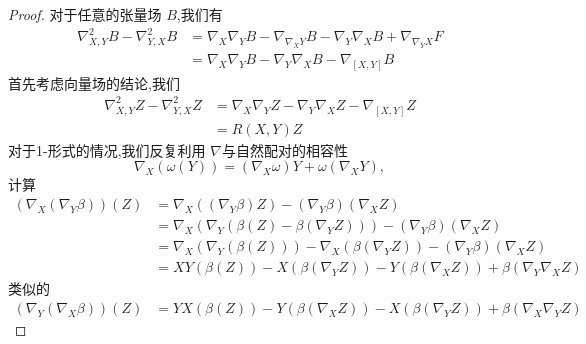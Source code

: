 \documentclass[../../几何与拓扑.tex]{subfiles}
\begin{document}
\begin{proof}

    对于任意的张量场 \(  B  \),我们有 \[
    \begin{aligned}
        \nabla ^{2}_{X,Y}B- \nabla ^{2}_{Y,X}B&=  \nabla _{X} \nabla _{Y}B- \nabla _{ \nabla _{X}Y}B- \nabla _{Y} \nabla _{X}B+  \nabla _{ \nabla _{Y}X}F \\ 
         & =  \nabla _{X} \nabla _{Y}B- \nabla _{Y} \nabla _{X}B- \nabla _{\left[ X,Y \right] }B
    \end{aligned}
    \] 
    首先考虑向量场的结论,我们 \[
    \begin{aligned}
     \nabla ^{2}_{X,Y}Z- \nabla ^{2}_{Y,X}Z
      & =  \nabla _{X} \nabla _{Y}Z- \nabla _{Y} \nabla _{X}Z- \nabla _{\left[ X,Y \right] }Z  \\ 
       & = R\left( X,Y \right)Z 
    \end{aligned}
    \]对于1-形式的情况,我们反复利用 \(   \nabla   \)与自然配对的相容性 \[
     \nabla _{X}\left(  \omega \left( Y \right)  \right)= \left(  \nabla _{X} \omega  \right)Y+  \omega \left(  \nabla _{X}Y \right),   
    \] 计算 \[
  \begin{aligned}
   \left(  \nabla _{X} \left( \nabla _{Y} \beta  \right) \right)\left( Z \right)    &=  \nabla _{X}\left( \left(  \nabla _{Y}\beta  \right)Z  \right)- \left(  \nabla _{Y}\beta  \right)\left(  \nabla _{X}Z \right)\\ 
    & =  \nabla _{X}\left(  \nabla _{Y}\left( \beta \left( Z \right)-\beta \left(  \nabla _{Y}Z \right)   \right)  \right)-\left(  \nabla _{Y}\beta  \right)\left(  \nabla _{X}Z \right)\\ 
     & =  \nabla _{X}\left(  \nabla _{Y}\left( \beta \left( Z \right)  \right)  \right)- \nabla _{X}\left( \beta \left(  \nabla _{Y}Z \right)  \right)-\left(  \nabla _{Y}\beta  \right)\left(  \nabla _{X}Z \right)          \\ 
      & = XY\left( \beta \left( Z \right)  \right)-X\left( \beta \left(  \nabla _{Y}Z \right)  \right)-Y\left( \beta \left(  \nabla _{X}Z \right)  \right)   + \beta \left(  \nabla _{Y} \nabla _{X}Z \right) 
  \end{aligned}
    \]类似的 \[
    \begin{aligned}
    \left(  \nabla _{Y}\left(  \nabla _{X}\beta  \right)  \right)\left( Z \right)& = YX\left( \beta \left( Z \right)  \right)-Y\left( \beta \left(  \nabla _{X}Z \right)  \right)-X\left( \beta \left(  \nabla _{Y}Z \right)  \right)       + \beta \left(  \nabla _{X} \nabla _{Y}Z \right) 
    \end{aligned}
\]
\end{proof}
\end{document}
